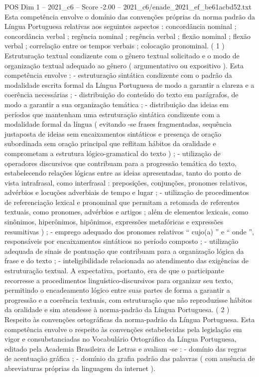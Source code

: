 \begin{textsample}{POS Dim 1 – 2021\_c6 – Score -2.00 – 2021\_c6/enade\_2021\_ef\_be61acbd52.txt}
Esta competência envolve o domínio das convenções próprias da norma padrão da Língua Portuguesa relativas aos seguintes aspectos : concordância nominal ; concordância verbal ; regência nominal ; regência verbal ; flexão nominal ; flexão verbal ; correlação entre os tempos verbais ; colocação pronominal. ( 1 ) Estruturação textual condizente com o gênero textual solicitado e o modo de organização textual adequado ao gênero ( argumentativo ou expositivo ).
Esta competência envolve : - estruturação sintática condizente com o padrão da modalidade escrita formal da Língua Portuguesa de modo a garantir a clareza e a coerência necessárias ; - distribuição do conteúdo do texto em parágrafos, de modo a garantir a sua organização temática ; - distribuição das ideias em períodos que mantenham uma estruturação sintática condizente com a modalidade formal da língua ( evitando -se frases fragmentadas, sequência justaposta de ideias sem encaixamentos sintáticos e presença de oração subordinada sem oração principal que reflitam hábitos da oralidade e comprometam a estrutura lógico-gramatical do texto ) ; - utilização de operadores discursivos que contribuam para a progressão temática do texto, estabelecendo relações lógicas entre as ideias apresentadas, tanto do ponto de vista intrafrasal, como interfrasal : preposições, conjunções, pronomes relativos, advérbios e locuções adverbiais de tempo e lugar ; - utilização de procedimentos de referenciação lexical e pronominal que permitam a retomada de referentes textuais, como pronomes, advérbios e artigos ; além de elementos lexicais, como sinônimos, hiperônimos, hipônimos, expressões metafóricas e expressões resumitivas ) ; - emprego adequado dos pronomes relativos “ cujo(a) ” e “ onde ”, responsáveis por encaixamentos sintáticos no período composto ; - utilização adequada de sinais de pontuação que contribuam para a organização lógica da frase e do texto ; - inteligibilidade relacionada ao atendimento das exigências de estruturação textual.
A expectativa, portanto, era de que o participante recorresse a procedimentos linguístico-discursivos para organizar seu texto, permitindo o encadeamento lógico entre suas partes de forma a garantir a progressão e a coerência textuais, com estruturação que não reproduzisse hábitos da oralidade e sim atendesse à norma-padrão da Língua Portuguesa. ( 2 ) Respeito às convenções ortográficas da norma-padrão da Língua Portuguesa.
Esta competência envolve o respeito às convenções estabelecidas pela legislação em vigor e consubstanciadas no Vocabulário Ortográfico da Língua Portuguesa, editado pela Academia Brasileira de Letras e avaliam -se : - domínio das regras de acentuação gráfica ; - domínio da grafia padrão das palavras ( com ausência de abreviaturas próprias da linguagem da internet ).

\end{textsample}
